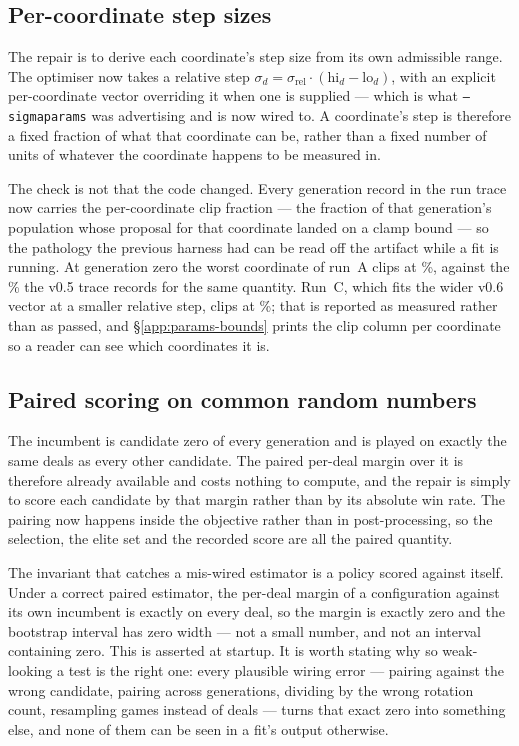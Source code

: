 \subsection{Per-coordinate step sizes}
\label{sec:fit-sigma}

The repair is to derive each coordinate's step size from its own admissible
range. The optimiser now takes a relative step $\sigma_d = \sigma_{\mathrm{rel}}
\cdot (\mathrm{hi}_d - \mathrm{lo}_d)$, with an explicit per-coordinate vector
overriding it when one is supplied --- which is what \texttt{--sigmaparams} was
advertising and is now wired to. A coordinate's step is therefore a fixed
fraction of what that coordinate can be, rather than a fixed number of units of
whatever the coordinate happens to be measured in.

The check is not that the code changed. Every generation record in the run trace
now carries the per-coordinate clip fraction --- the fraction of that
generation's population whose proposal for that coordinate landed on a clamp
bound --- so the pathology the previous harness had can be read off the artifact
while a fit is running. At generation zero the worst coordinate of run~A clips at
\vsixFitAClipGenZero{}\%, against the \numClipDeclMargin{}\% the v0.5 trace
records for the same quantity. Run~C, which fits the wider v0.6 vector at a
smaller relative step, clips at \vsixFitCClipGenZero{}\%; that is reported as
measured rather than as passed, and \S\ref{app:params-bounds} prints the clip
column per coordinate so a reader can see which coordinates it is.

\subsection{Paired scoring on common random numbers}
\label{sec:fit-paired}

The incumbent is candidate zero of every generation and is played on exactly the
same deals as every other candidate. The paired per-deal margin over it is
therefore already available and costs nothing to compute, and the repair is
simply to score each candidate by that margin rather than by its absolute win
rate. The pairing now happens inside the objective rather than in
post-processing, so the selection, the elite set and the recorded score are all
the paired quantity.

The invariant that catches a mis-wired estimator is a policy scored against
itself. Under a correct paired estimator, the per-deal margin of a configuration
against its own incumbent is exactly \vsixPairedSelfDelta{} on every deal, so the
margin is exactly zero and the bootstrap interval has zero width --- not a small
number, and not an interval containing zero. This is asserted at startup. It is
worth stating why so weak-looking a test is the right one: every plausible wiring
error --- pairing against the wrong candidate, pairing across generations,
dividing by the wrong rotation count, resampling games instead of deals --- turns
that exact zero into something else, and none of them can be seen in a fit's
output otherwise.

